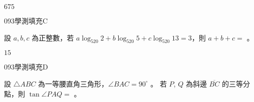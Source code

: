 \begin{QUESTIONS}
\begin{QUESTION}
        \begin{QANS}
            $675$
        \end{QANS}
        \begin{QSOLLIST}
        \end{QSOLLIST}
        \begin{QEMPTYSPACE}
        \end{QEMPTYSPACE}
    \end{QUESTION}
    \begin{QUESTION}
        \begin{ExamInfo}{093}{學測}{填充}{C}
        \end{ExamInfo}
        \begin{ExamAnsRateInfo}{36}{77}{27}{4}
        \end{ExamAnsRateInfo}
        \begin{QBODY}
            設 $a,b,c$ 為正整數，若 $a\log_{520} 2+b\log_{520} 5+c\log_{520}13=3$，則 $a+b+c=$ 
            \TCNBOX{} 。
        \end{QBODY}
        \begin{QFROMS}
        \end{QFROMS}
        \begin{QTAGS}\end{QTAGS}
        \begin{QANS}
            $15$
        \end{QANS}
        \begin{QSOLLIST}
        \end{QSOLLIST}
        \begin{QEMPTYSPACE}
        \end{QEMPTYSPACE}
    \end{QUESTION}
    \begin{QUESTION}
        \begin{ExamInfo}{093}{學測}{填充}{D}
        \end{ExamInfo}
        \begin{ExamAnsRateInfo}{19}{45}{8}{4}
        \end{ExamAnsRateInfo}
        \begin{QBODY}
            設 $\triangle ABC$ 為一等腰直角三角形，$\angle BAC = 90^\circ$ 。
            若 $P$, $Q$ 為斜邊 $\overline{BC}$ 的三等分點，則 $\tan \angle PAQ = $
            \TCNBOX{\TCN\TCN} 。
        \end{QBODY}
        \begin{QFROMS}
        \end{QFROMS}
        \begin{QTAGS}\end{QTAGS}

\end{QUESTION}
\end{QUESTIONS}
